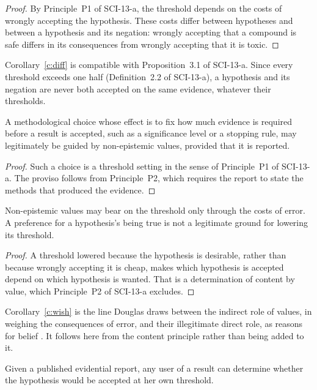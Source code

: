 \documentclass{situationist-preprint}
\begin{document}
\begin{proof}
By Principle~P1 of SCI-13-a, the threshold depends on the costs of wrongly accepting the hypothesis. These costs differ between hypotheses and between a hypothesis and its negation: wrongly accepting that a compound is safe differs in its consequences from wrongly accepting that it is toxic.
\end{proof}

Corollary~\ref{c:diff} is compatible with Proposition~3.1 of SCI-13-a. Since every threshold exceeds one half (Definition~2.2 of SCI-13-a), a hypothesis and its negation are never both accepted on the same evidence, whatever their thresholds.

\begin{corollary}\label{c:method}
A methodological choice whose effect is to fix how much evidence is required before a result is accepted, such as a significance level or a stopping rule, may legitimately be guided by non-epistemic values, provided that it is reported.
\end{corollary}

\begin{proof}
Such a choice is a threshold setting in the sense of Principle~P1 of SCI-13-a. The proviso follows from Principle~P2, which requires the report to state the methods that produced the evidence.
\end{proof}

\begin{corollary}\label{c:wish}
Non-epistemic values may bear on the threshold only through the costs of error. A preference for a hypothesis's being true is not a legitimate ground for lowering its threshold.
\end{corollary}

\begin{proof}
A threshold lowered because the hypothesis is desirable, rather than because wrongly accepting it is cheap, makes which hypothesis is accepted depend on which hypothesis is wanted. That is a determination of content by value, which Principle~P2 of SCI-13-a excludes.
\end{proof}

Corollary~\ref{c:wish} is the line Douglas draws between the indirect role of values, in weighing the consequences of error, and their illegitimate direct role, as reasons for belief \citep{Douglas2009}. It follows here from the content principle rather than being added to it.

\begin{corollary}[Recomputability]\label{c:recompute}
Given a published evidential report, any user of a result can determine whether the hypothesis would be accepted at her own threshold.
\end{corollary}
\end{document}

